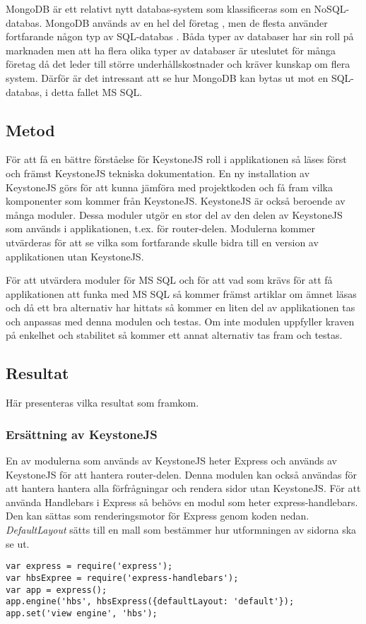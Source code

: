 MongoDB är ett relativt nytt databas-system som klassificeras som en NoSQL-databas. MongoDB används av en hel del företag \cite{mongoComp}, men de flesta använder fortfarande någon typ av SQL-databas \cite{databaseStats}. Båda typer av databaser har sin roll på marknaden \cite{compareSQL} men att ha flera olika typer av databaser är uteslutet för många företag då det leder till större underhållskostnader och kräver kunskap om flera system. Därför är det intressant att se hur MongoDB kan bytas ut mot en SQL-databas, i detta fallet MS SQL.


\subsection{Metod}
För att få en bättre förståelse för KeystoneJS roll i applikationen så läses först och främst KeystoneJS tekniska dokumentation. En ny installation av KeystoneJS görs för att kunna jämföra med projektkoden och få fram vilka komponenter som kommer från KeystoneJS. KeystoneJS är också beroende av många moduler. Dessa moduler utgör en stor del av den delen av KeystoneJS som används i applikationen, t.ex. för router-delen. Modulerna kommer utvärderas för att se vilka som fortfarande skulle bidra till en version av applikationen utan KeystoneJS. 

För att utvärdera moduler för MS SQL och för att vad som krävs för att få applikationen att funka med MS SQL så kommer främst artiklar om ämnet läsas och då ett bra alternativ har hittats så kommer en liten del av applikationen tas och anpassas med denna modulen och testas. Om inte modulen uppfyller kraven på enkelhet och stabilitet så kommer ett annat alternativ tas fram och testas.

\subsection{Resultat}
Här presenteras vilka resultat som framkom. 
\subsubsection{Ersättning av KeystoneJS}
En av modulerna som används av KeystoneJS heter Express och används av KeystoneJS för att hantera router-delen. Denna modulen kan också användas för att hantera hantera  alla förfrågningar \cite{expressRouter} och rendera sidor utan KeystoneJS. För att använda Handlebars i Express så behövs en modul som heter express-handlebars. Den kan sättas som renderingsmotor för Express genom koden nedan. \textit{DefaultLayout} sätts till en mall som bestämmer hur utformningen av sidorna ska se ut. 
\begin{verbatim}
var express = require('express');
var hbsExpree = require('express-handlebars');
var app = express();
app.engine('hbs', hbsExpress({defaultLayout: 'default'});
app.set('view engine', 'hbs');
\end{verbatim}

